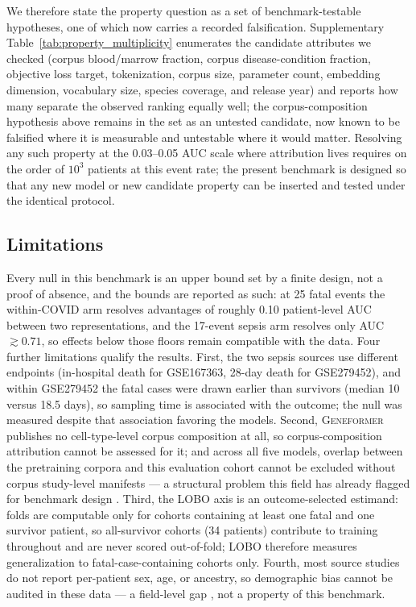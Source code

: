 \documentclass[11pt,a4paper]{article}
\newcommand{\model}[1]{\textsc{#1}}
\begin{document}
We therefore state the property question as a set of benchmark-testable
hypotheses, one of which now carries a recorded falsification. Supplementary
Table~\ref{tab:property_multiplicity} enumerates the candidate attributes we
checked (corpus blood/marrow fraction, corpus disease-condition fraction,
objective loss target, tokenization, corpus size, parameter count, embedding
dimension, vocabulary size, species coverage, and release year) and reports
how many separate the observed ranking equally well; the corpus-composition
hypothesis above remains in the set as an untested candidate, now known to be
falsified where it is measurable and untestable where it would matter.
Resolving any such property at the 0.03--0.05 AUC scale where attribution
lives requires on the order of $10^3$ patients at this event rate; the
present benchmark is designed so that any new model or new candidate property
can be inserted and tested under the identical protocol.

\subsection{Limitations}
\label{ssec:limitations}

Every null in this benchmark is an upper bound set by a finite design, not a
proof of absence, and the bounds are reported as such: at 25 fatal events the
within-COVID arm resolves advantages of roughly 0.10 patient-level AUC between
two representations, and the 17-event sepsis arm resolves only AUC
$\gtrsim 0.71$, so effects below those floors remain compatible with the
data. Four further limitations qualify the results. First, the two sepsis
sources use different endpoints (in-hospital death for GSE167363, 28-day
death for GSE279452), and within GSE279452 the fatal cases were drawn earlier
than survivors (median 10 versus 18.5 days), so sampling time is associated
with the outcome; the null was measured despite that association favoring the
models. Second, \model{Geneformer} publishes no cell-type-level corpus
composition at all, so corpus-composition attribution cannot be assessed for
it; and across all five models, overlap between the pretraining corpora and
this evaluation cohort cannot be excluded without corpus study-level
manifests --- a structural problem this field has already flagged for
benchmark design \citep{kedzierska2025zeroshot}.
Third, the LOBO axis is an outcome-selected estimand: folds are computable
only for cohorts containing at least one fatal and one survivor patient, so
all-survivor cohorts (34 patients) contribute to training throughout and are
never scored out-of-fold; LOBO therefore measures generalization to
fatal-case-containing cohorts only. Fourth, most source studies do not report
per-patient sex, age, or ancestry, so demographic bias cannot be audited in
these data --- a field-level gap \citep{corpas2025diversity, pot2019gender},
not a property of this benchmark.
\end{document}
